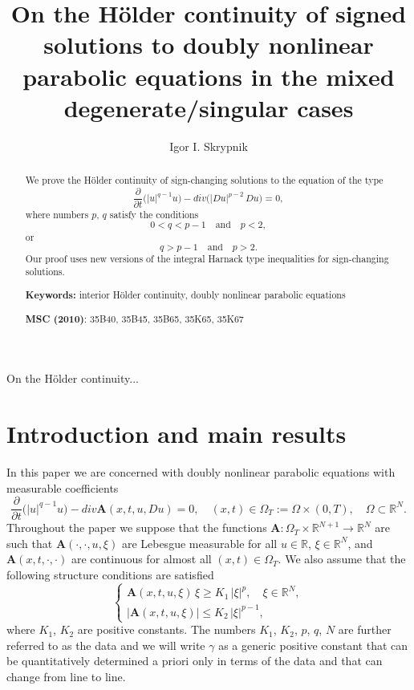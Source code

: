 \documentclass[a4paper,11pt,fullpage]{article}
\numberwithin{equation}{section}
\begin{document}
\title{On the  H\"{o}lder continuity of signed solutions to doubly nonlinear  parabolic equations in the mixed degenerate/singular  cases}

\author{ Igor I. Skrypnik
 }
\maketitle

  \begin{abstract}

We prove the H\"{o}lder continuity of sign-changing solutions to the equation of the type
$$\frac{\partial}{\partial t}\big(|u|^{q-1} u\big)- div\Big(|D u|^{p-2}\,D u\Big)=0,$$ 
where  numbers $p$, $q$ satisfy  the conditions
$$0<q<p-1\quad 
\text{and}\quad p<2,$$
or
$$q>p-1\quad\text{and}\quad p>2.$$ 
Our proof uses new versions of the integral Harnack type inequalities for sign-changing solutions.

\textbf{Keywords:}
interior H\"{o}lder continuity, doubly nonlinear parabolic equations



\textbf{MSC (2010)}: 35B40, 35B45, 35B65, 35K65, 35K67

\end{abstract}


  \pagestyle{myheadings} \thispagestyle{plain}
{On the H\"{o}lder continuity...}

\section{Introduction and main results}\label{Introduction}
 In this paper we are concerned with doubly nonlinear parabolic equations
 with measurable coefficients
 \begin{equation}\label{eq1.1}
 \frac{\partial}{\partial t}\big(|u|^{q-1} u\big)- div \mathbf{A}(x, t, u, D u)=0,\quad (x, t)\in \Omega_T:=\Omega\times (0, T),\quad \Omega\subset \mathbb{R}^N.
 \end{equation}
Throughout the paper we suppose that the functions $\mathbf{A} :\Omega_T\times \mathbb{R}^{N+1}\rightarrow  \mathbb{R}^N$
are such that $\mathbf{A}(\cdot, \cdot, u, \xi)$ are Lebesgue measurable for all $u\in \mathbb{R}$, $\xi\in \mathbb{R}^N$, and
 $\mathbf{A}(x, t, \cdot, \cdot)$ are continuous for almost all $(x,t)\in \Omega_T.$  We also assume that the following structure conditions are satisfied
 \begin{equation}\label{eq1.2}
 \begin{cases}
 \mathbf{A}(x, t, u, \xi)\,\xi\geqslant K_1\,|\xi|^p,\quad \xi\in \mathbb{R}^N,\\
 |\mathbf{A}(x, t, u, \xi)|\leqslant K_2\,|\xi|^{p-1},
 \end{cases}
 \end{equation}
where $K_1$, $K_2$ are positive constants. The numbers $K_1$, $K_2$, $p$, $q$, $N$ are further
 referred to as the data and  we will write $\gamma$ as a generic positive constant that can be quantitatively determined
 a priori only in terms of the data and that can change from line to line.
\end{document}
